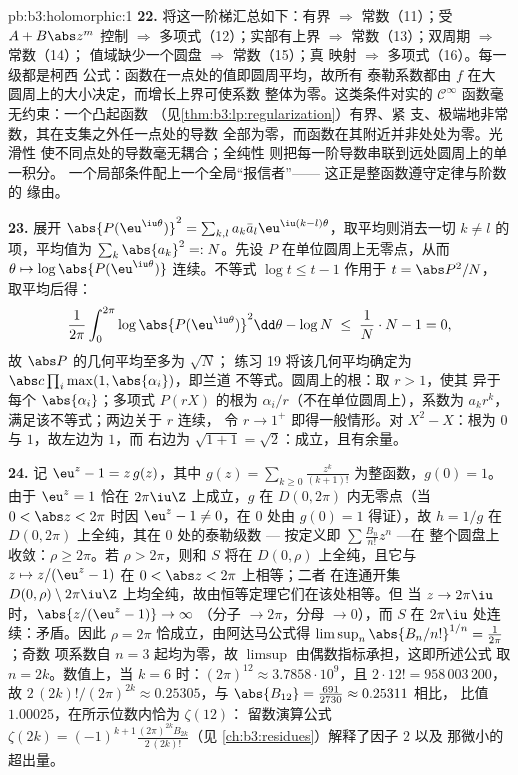 \begin{solution}{pb:b3:holomorphic:1}
\textbf{22.} 将这一阶梯汇总如下：有界 $\Rightarrow$
常数（11）；受 $A + B\abs z^m$ 控制 $\Rightarrow$
多项式（12）；实部有上界 $\Rightarrow$
常数（13）；双周期 $\Rightarrow$ 常数（14）；
值域缺少一个圆盘 $\Rightarrow$ 常数（15）；真
映射 $\Rightarrow$ 多项式（16）。每一级都是柯西
公式：函数在一点处的值即圆周平均，故所有
泰勒系数都由 $f$ 在大
圆周上的大小决定，而增长上界可使系数
整体为零。这类条件对实的 $\mathcal
C^\infty$ 函数毫无约束：一个凸起函数
（见\cref{thm:b3:lp:regularization}）有界、紧
支、极端地非常数，其在支集之外任一点处的导数
全部为零，而函数在其附近并非处处为零。光滑性
使不同点处的导数毫无耦合；全纯性
则把每一阶导数串联到远处圆周上的单一积分。
一个局部条件配上一个全局“报信者”——
这正是整函数遵守定律与阶数的
缘由。

\textbf{23.} 展开
$\abs{P(\eu^{\iu\theta})}^2 = \sum_{k,l}a_k\bar a_l
\eu^{\iu(k-l)\theta}$，取平均则消去一切 $k \neq
l$ 的项，平均值为 $\sum_k\abs{a_k}^2 =: N$。先设
$P$ 在单位圆周上无零点，从而 $\theta \mapsto
\log\abs{P(\eu^{\iu\theta})}$ 连续。不等式 $\log
t \leq t - 1$ 作用于 $t = \abs P^2/N$，
取平均后得：
\[
\frac1{2\pi}\int_0^{2\pi}\log\abs{P(\eu^{\iu\theta})}^2
\dd\theta - \log N
\;\leq\; \frac1N\cdot N - 1 = 0,
\]
故 $\abs P$ 的几何平均至多为 $\sqrt N$；
练习 19 将该几何平均确定为
$\abs c\prod_i\max(1, \abs{\alpha_i})$，即兰道
不等式。圆周上的根：取 $r > 1$，使其
异于每个 $\abs{\alpha_i}$；多项式 $P(rX)$ 的根为
$\alpha_i/r$（不在单位圆周上），系数为 $a_kr^k$，
满足该不等式；两边关于 $r$ 连续，
令 $r \to 1^+$ 即得一般情形。对 $X^2 -
X$：根为 $0$ 与 $1$，故左边为 $1$，而
右边为 $\sqrt{1 + 1} = \sqrt2$：成立，且有余量。

\textbf{24.} 记 $\eu^z - 1 = z\,g(z)$，其中 $g(z) =
\sum_{k\geq0}\frac{z^k}{(k+1)!}$ 为整函数，$g(0) = 1$。由于
$\eu^z = 1$ 恰在 $2\pi\iu\Z$ 上成立，$g$ 在
$D(0, 2\pi)$ 内无零点（当 $0 < \abs z < 2\pi$ 时因 $\eu^z - 1
\neq 0$，在 $0$ 处由 $g(0) = 1$ 得证），故 $h = 1/g$ 在
$D(0,2\pi)$ 上全纯，其在 $0$ 处的泰勒级数 ---
按定义即 $\sum\frac{B_n}{n!}z^n$ ---在
整个圆盘上收敛：$\rho \geq 2\pi$。若 $\rho > 2\pi$，则和 $S$
将在 $D(0,\rho)$ 上全纯，且它与 $z
\mapsto z/(\eu^z - 1)$ 在 $0 < \abs z < 2\pi$ 上相等；二者
在连通开集 $D(0,\rho) \setminus
2\pi\iu\Z$ 上均全纯，故由恒等定理它们在该处相等。但
当 $z \to 2\pi\iu$ 时，$\abs{z/(\eu^z - 1)} \to \infty$
（分子 $\to 2\pi$，分母 $\to 0$），而 $S$
在 $2\pi\iu$ 处连续：矛盾。因此 $\rho = 2\pi$
恰成立，由阿达马公式得
$\limsup_n\abs{B_n/n!}^{1/n} = \frac1{2\pi}$；奇数
项系数自 $n = 3$ 起均为零，故 $\limsup$
由偶数指标承担，这即所述公式
取 $n = 2k$。数值上，当 $k = 6$ 时：$(2\pi)^{12} \approx
3.7858\cdot10^9$，且 $2\cdot12! = 958\,003\,200$，故
$2\,(2k)!/(2\pi)^{2k} \approx 0.25305$，与
$\abs{B_{12}} = \frac{691}{2730} \approx 0.25311$ 相比，
比值 $1.00025$，在所示位数内恰为 $\zeta(12)$：
留数演算公式 $\zeta(2k) =
(-1)^{k+1}\frac{(2\pi)^{2k}B_{2k}}{2\,(2k)!}$（见
\cref{ch:b3:residues}）解释了因子 $2$ 以及
那微小的超出量。


\end{solution}
